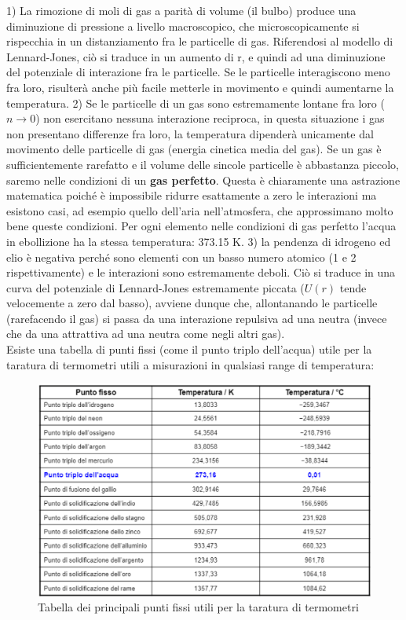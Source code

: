 \documentclass[10pt,a4paper]{article}
\begin{document}
1) La rimozione di moli di gas a parità di volume (il bulbo) produce una diminuzione di pressione a livello macroscopico, che microscopicamente si rispecchia in un distanziamento fra le particelle di gas. Riferendosi al modello di Lennard-Jones, ciò si traduce in un aumento di r, e quindi ad una diminuzione del potenziale di interazione fra le particelle. Se le particelle interagiscono meno fra loro, risulterà anche più facile metterle in movimento e quindi aumentarne la temperatura. 2) Se le particelle di un gas sono estremamente lontane fra loro ($n \to 0$) non esercitano nessuna interazione reciproca, in questa situazione i gas non presentano differenze fra loro, la temperatura dipenderà unicamente dal movimento delle particelle di gas (energia cinetica media del gas). Se un gas è sufficientemente rarefatto e il volume delle sincole particelle è abbastanza piccolo, saremo nelle condizioni di un \textbf{gas perfetto}. Questa è chiaramente una astrazione matematica poiché è impossibile ridurre esattamente a zero le interazioni ma esistono casi, ad esempio quello dell'aria nell'atmosfera, che approssimano molto bene queste condizioni. Per ogni elemento nelle condizioni di gas perfetto l'acqua in ebollizione ha la stessa temperatura: 373.15 \textdegree K. 3) la pendenza di idrogeno ed elio è negativa perché sono elementi con un basso numero atomico (1 e 2 rispettivamente) e le interazioni sono estremamente deboli. Ciò si traduce in una curva del potenziale di Lennard-Jones estremamente piccata ($U(r)$ tende velocemente a zero dal basso), avviene dunque che, allontanando le particelle (rarefacendo il gas) si passa da una interazione repulsiva ad una neutra (invece che da una attrattiva ad una neutra come negli altri gas).\\
Esiste una tabella di punti fissi (come il punto triplo dell'acqua) utile per la taratura di termometri utili a misurazioni in qualsiasi range di temperatura:
\begin{figure}[h!]
	\centering
	\includegraphics[width=0.7\linewidth]{Punti_fissi}
	\caption{Tabella dei principali punti fissi utili per la taratura di termometri}
	\label{fig:puntifissi}
\end{figure}
\end{document}

